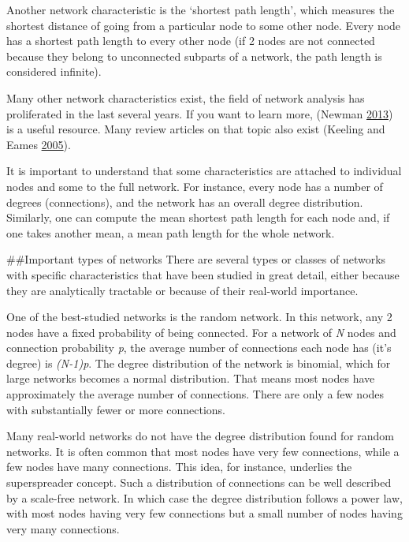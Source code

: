 \documentclass[]{book}
\theoremstyle{definition}
\theoremstyle{definition}
\theoremstyle{definition}
\theoremstyle{remark}
\begin{document}
Another network characteristic is the `shortest path length', which
measures the shortest distance of going from a particular node to some
other node. Every node has a shortest path length to every other node
(if 2 nodes are not connected because they belong to unconnected
subparts of a network, the path length is considered infinite).

Many other network characteristics exist, the field of network analysis
has proliferated in the last several years. If you want to learn more,
(Newman \protect\hyperlink{ref-newman13}{2013}) is a useful resource.
Many review articles on that topic also exist (Keeling and Eames
\protect\hyperlink{ref-keeling05}{2005}).

It is important to understand that some characteristics are attached to
individual nodes and some to the full network. For instance, every node
has a number of degrees (connections), and the network has an overall
degree distribution. Similarly, one can compute the mean shortest path
length for each node and, if one takes another mean, a mean path length
for the whole network.

\#\#Important types of networks There are several types or classes of
networks with specific characteristics that have been studied in great
detail, either because they are analytically tractable or because of
their real-world importance.

One of the best-studied networks is the random network. In this network,
any 2 nodes have a fixed probability of being connected. For a network
of \emph{N} nodes and connection probability \emph{p}, the average
number of connections each node has (it's degree) is \emph{(N-1)p}. The
degree distribution of the network is binomial, which for large networks
becomes a normal distribution. That means most nodes have approximately
the average number of connections. There are only a few nodes with
substantially fewer or more connections.

Many real-world networks do not have the degree distribution found for
random networks. It is often common that most nodes have very few
connections, while a few nodes have many connections. This idea, for
instance, underlies the superspreader concept. Such a distribution of
connections can be well described by a scale-free network. In which case
the degree distribution follows a power law, with most nodes having very
few connections but a small number of nodes having very many
connections.
\end{document}
